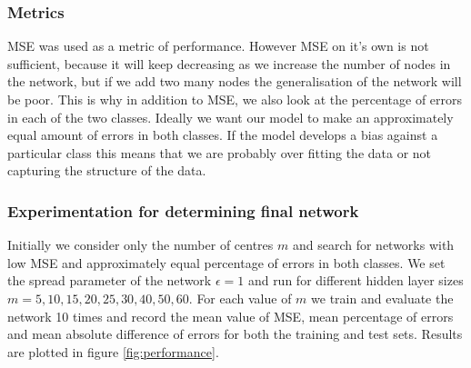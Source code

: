 \documentclass[a4paper, 11pt]{article}
\begin{document}
\subsubsection{Metrics}
MSE was used as a metric of performance. However MSE on it's own is not sufficient, because it will keep decreasing as we increase the number of nodes in the network, but if we add two many nodes the generalisation of the network will be poor. This is why in addition to MSE, we also look at the percentage of errors in each of the two classes. Ideally we want our model to make an approximately equal amount of errors in both classes. If the model develops a bias against a particular class this means that we are probably over fitting the data or not capturing the structure of the data.



\subsubsection{Experimentation for determining final network}
Initially we consider only the number of centres $m$ and search for networks with low MSE and approximately equal percentage of errors in both classes. We set the spread parameter of the network $\epsilon = 1$ and run for different hidden layer sizes $m = 5, 10, 15, 20, 25, 30, 40, 50, 60$. For each value of $m$ we train and evaluate the network 10 times and record the mean value of MSE, mean percentage of errors and mean absolute difference of errors for both the training and test sets. Results are plotted in figure \ref{fig:performance}.
\end{document}
